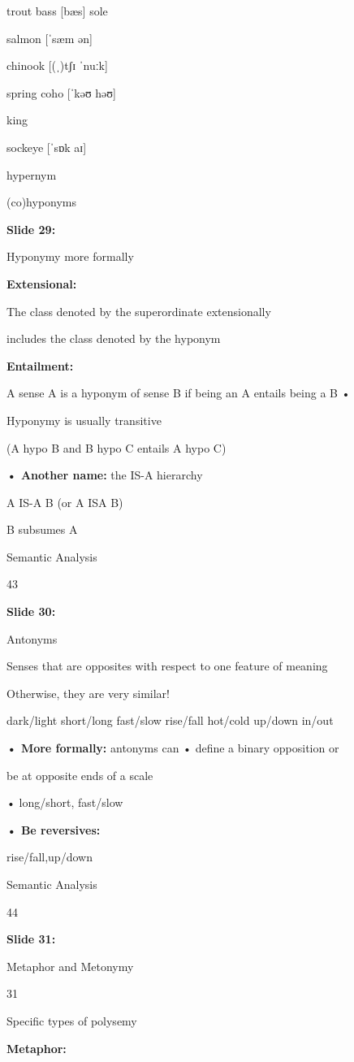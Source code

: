 \documentclass[11pt,a4paper]{article}
\begin{document}
trout	bass [bæs]	sole

salmon [ˈsæm ən]

chinook [(ˌ)tʃɪ ˈnuːk]

spring  coho [ˈkəʊ həʊ]

king

sockeye [ˈsɒk aɪ]

hypernym

(co)hyponyms

\textbf{Slide 29:}

Hyponymy more formally

\textbf{Extensional:} 

The class denoted by the superordinate extensionally

includes the class denoted by the hyponym

\textbf{Entailment:} 

A sense A is a hyponym of sense B if being an A entails being a B •

Hyponymy is usually transitive

(A hypo B and B hypo C entails A hypo C)

\textbf{• Another name:}  the IS-A hierarchy

A IS-A B	(or A ISA B)

B subsumes A

Semantic Analysis

43

\textbf{Slide 30:}

Antonyms

Senses that are opposites with respect to one feature of  meaning

Otherwise, they are very similar!

dark/light short/long fast/slow rise/fall hot/cold up/down  in/out

\textbf{• More formally:}  antonyms can • define a binary opposition or

be at opposite ends of a scale

• long/short, fast/slow

\textbf{• Be reversives:} 

rise/fall,up/down

Semantic Analysis

44

\textbf{Slide 31:}

Metaphor and Metonymy

31

Specific types of polysemy

\textbf{Metaphor:} 
\end{document}
